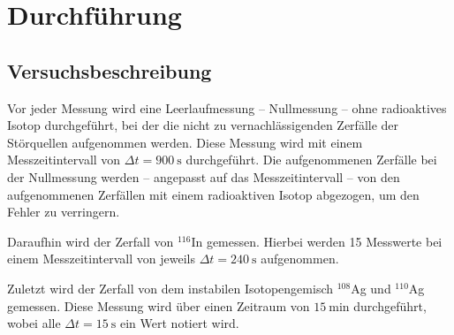\section{Durchführung}
\label{sec:Durchführung}



\subsection{Versuchsbeschreibung}
\label{sec:Versuchsbeschreibung}
Vor jeder Messung wird eine Leerlaufmessung -- Nullmessung -- ohne radioaktives Isotop
durchgeführt, bei der die 
nicht zu vernachlässigenden Zerfälle der Störquellen aufgenommen werden. Diese Messung wird mit
einem Messzeitintervall von $\Delta t = \SI{900}{\second}$ durchgeführt. Die aufgenommenen 
Zerfälle bei der Nullmessung werden -- angepasst auf das Messzeitintervall -- von den 
aufgenommenen Zerfällen mit einem radioaktiven Isotop abgezogen, um den Fehler zu verringern.

Daraufhin wird der Zerfall von $^{116}$In gemessen. Hierbei werden 15 Messwerte bei einem 
Messzeitintervall von jeweils $\Delta t = \SI{240}{\second}$ aufgenommen. 

Zuletzt wird der Zerfall von dem instabilen Isotopengemisch $^{108}$Ag und $^{110}$Ag gemessen.
Diese Messung wird über einen Zeitraum von $\SI{15}{\minute}$ durchgeführt, wobei alle
$\Delta t = \SI{15}{\second}$ ein Wert notiert wird.
